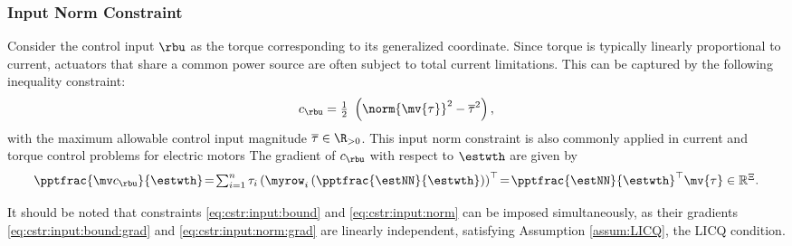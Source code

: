 \documentclass[letterpaper, journal]{IEEEtran}
\newcommand*{\template}{template}
\providecommand{\DIFadd}[1]{{\protect\color{blue}\uwave{#1}}} %
\providecommand{\DIFaddbegin}{} %
\providecommand{\DIFaddend}{} %
\providecommand{\DIFdelbegin}{} %
\providecommand{\DIFdelend}{} %
\begin{document}
\subsubsection{Input Norm Constraint}\label{sec:appen:cstr:input:norm}

Consider the control input $\rbu$ as the torque corresponding to its generalized coordinate. 
Since torque is typically linearly proportional to current, actuators that share a common power source are often subject to total current limitations. 
This can be captured by the following inequality constraint: 
\begin{equation}
    c_{\rbu}
    =
    \tfrac{1}{2}\
    \left(
        \norm{
        \mv{\tau}
        }^2 
        -
        \overline\tau^2
    \right)
    ,
    \label{eq:cstr:input:norm}
\end{equation}
with the maximum allowable control input magnitude $\overline\tau\in\R_{>0}$. This input norm constraint is also commonly applied in current and torque control problems for electric motors %
\DIFaddbegin \DIFadd{\mbox{%
\cite{Choi:2024aa}}\hskip0pt%
.
}\DIFaddend %
The gradient of $c_{\rbu}$ with respect to $\estwth$ are given by
\begin{equation}
    \pptfrac{\mv c_{\rbu}}{\estwth}
    \!=\! 
    \textstyle\sum_{i=1}^n \tau_{i} 
    \left(
        \myrow_i
        \left(
            \pptfrac{\estNN}{\estwth}
        \right)
    \right)^\top  
    \!=\! 
    {\pptfrac{\estNN}{\estwth}}^\top
    \mv{\tau}
    \in \mathbb R^{\Xi}.
    \label{eq:cstr:input:norm:grad}
\end{equation}

\hfill

It should be noted that constraints \eqref{eq:cstr:input:bound} and \eqref{eq:cstr:input:norm} can be imposed simultaneously, as their gradients \eqref{eq:cstr:input:bound:grad} and \eqref{eq:cstr:input:norm:grad} are linearly independent, satisfying Assumption \ref{assum:LICQ}, \ie the LICQ condition.


\DIFdelbegin %
\DIFdelend \DIFaddbegin 
\DIFaddend 
\end{document}
